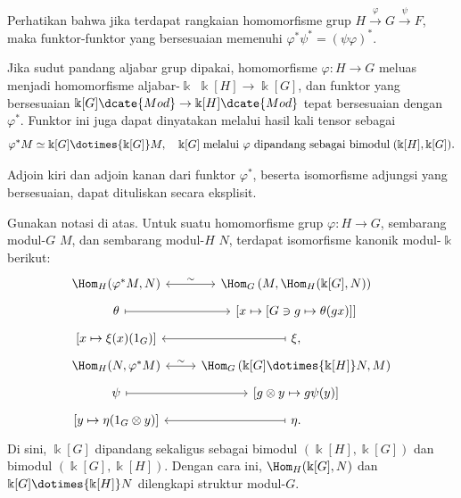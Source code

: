 Perhatikan bahwa jika terdapat rangkaian homomorfisme grup
$H\xrightarrow{\varphi}G\xrightarrow{\psi}F$, maka funktor-funktor yang
bersesuaian memenuhi $\varphi^*\psi^*=(\psi\varphi)^*$.

Jika sudut pandang aljabar grup dipakai, homomorfisme $\varphi:H\to G$ meluas
menjadi homomorfisme aljabar-$\Bbbk$ $\Bbbk[H]\to\Bbbk[G]$, dan funktor yang
bersesuaian $\Bbbk[G]\dcate{Mod}\to\Bbbk[H]\dcate{Mod}$ tepat bersesuaian
dengan $\varphi^*$. Funktor ini juga dapat dinyatakan melalui hasil kali tensor
sebagai
\begin{equation}\label{eqn:G-module-pullback-tensor}
	\varphi^* M \simeq \Bbbk[G] \dotimes{\Bbbk[G]} M, \quad \Bbbk[G] \;\text{melalui $\varphi$ dipandang sebagai bimodul}\; (\Bbbk[H], \Bbbk[G]).
\end{equation}

Adjoin kiri dan adjoin kanan dari funktor $\varphi^*$, beserta isomorfisme
adjungsi yang bersesuaian, dapat dituliskan secara eksplisit.

\begin{proposisi}\label{prop:pullback-two-adjoint}
	Gunakan notasi di atas. Untuk suatu homomorfisme grup $\varphi:H\to G$,
	sembarang modul-$G$ $M$, dan sembarang modul-$H$ $N$, terdapat isomorfisme
	kanonik modul-$\Bbbk$ berikut:
	\[\begin{tikzcd}[row sep=tiny]
		\Hom_H(\varphi^* M, N) \arrow[leftrightarrow, r, "\sim"] & \Hom_G\left( M, \Hom_H(\Bbbk[G], N) \right) \\
		\theta \arrow[mapsto, r] & {[x \mapsto [G \ni g \mapsto \theta(gx)] ]} \\
		{[x \mapsto \xi(x)(1_G)]} & \xi, \arrow[mapsto, l] \\
		\Hom_H(N, \varphi^* M) \arrow[leftrightarrow, r, "\sim"] & \Hom_G\left( \Bbbk[G] \dotimes{\Bbbk[H]} N, M \right) \\
		\psi \arrow[mapsto, r] & {[g \otimes y \mapsto g\psi(y)]} \\
		{[y \mapsto \eta(1_G \otimes y) ]} & \eta \arrow[mapsto, l].
	 \end{tikzcd}\]
	Di sini, $\Bbbk[G]$ dipandang sekaligus sebagai bimodul
	$(\Bbbk[H],\Bbbk[G])$ dan bimodul $(\Bbbk[G],\Bbbk[H])$. Dengan cara ini,
	$\Hom_H(\Bbbk[G],N)$ dan $\Bbbk[G]\dotimes{\Bbbk[H]}N$ dilengkapi struktur
	modul-$G$.
\end{proposisi}

